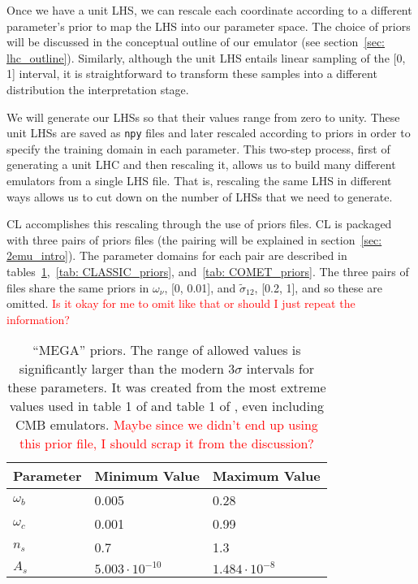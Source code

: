 Once we have a unit LHS, we can rescale each coordinate according to a 
different parameter's prior to map the LHS into our parameter space. The
choice of priors will be discussed in the conceptual outline of our
emulator (see section~\ref{sec: lhc_outline}). Similarly,
although the unit LHS entails linear sampling of the [0, 1] interval, it is 
straightforward to transform these samples into a different distribution
the interpretation stage.



We will generate our LHSs so that their values range from zero to unity.
These unit LHSs are saved as
\texttt{npy} files and later rescaled according to priors in order to
specify the training
domain in each parameter. This two-step process, first of generating a unit
LHC and then rescaling it, allows us to build many different emulators from a 
single LHS file. That is, rescaling the same LHS in different ways allows us
to cut down on the number of LHSs that we need to generate.


CL accomplishes this rescaling through the use of priors files.
CL is packaged with three pairs of priors files (the pairing will be explained
in section~\ref{sec: 2emu_intro}). The parameter domains for each pair are
described in tables~\ref{tab: MEGA_priors},~\ref{tab: CLASSIC_priors},
and~\ref{tab: COMET_priors}. The three pairs of files share the same priors in
$\omega_\nu$, [0, 0.01], and $\tilde{\sigma}_{12}$, [0.2, 1], and so these are
omitted. \textcolor{red}{Is it okay for me to omit like that or should I just
repeat the information?}

\begin{table}[ht!]
\centering
\begin{tabular}{l|l|l}
\hline
Parameter & Minimum Value & Maximum Value \\ \hline
$\omega_b$ & 0.005 & 0.28 \\
$\omega_c$ & 0.001 & 0.99 \\
$n_s$ & 0.7 & 1.3 \\
$A_s$\footnotemark & $5.003 \cdot 10^{-10}$ & $1.484 \cdot 10^{-8}$  \\
\end{tabular}
 \cprotect\caption[``MEGA'' priors]{``MEGA'' priors. The range of allowed
 	values is significantly larger than the modern $3\sigma$ intervals
 	for these parameters. It was created from the most extreme values used
 	in table 1 of \citet{Mancini} and table 1 of \citet{Arico}, even including
 	CMB emulators. 
 	\textcolor{red}{Maybe since we didn't end up using this prior file, I
 	should scrap it from the discussion?}}
 \label{tab: MEGA_priors}
\end{table}

